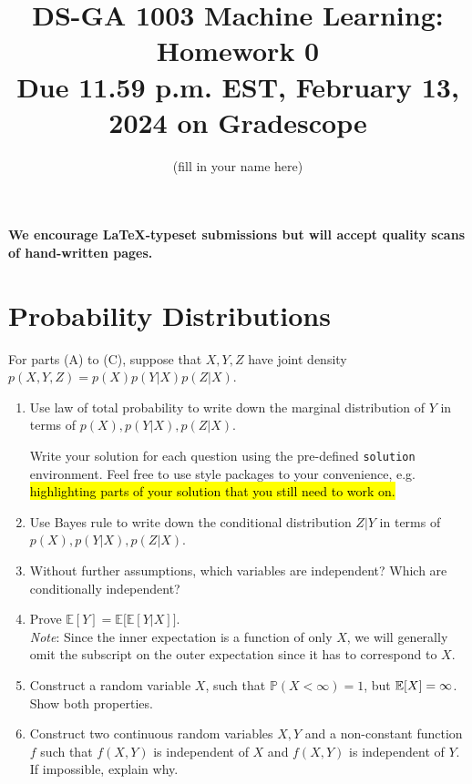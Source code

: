 \documentclass[11pt]{article}
\newenvironment{solution}{\proof[Solution]\color{blue}}{\endproof}
\begin{document}
\title{DS-GA 1003 Machine Learning: Homework 0 \\
\textbf{\large{Due 11.59 p.m. EST, February 13, 2024 on Gradescope}}}
\author{{\color{blue}(fill in your name here)}}
\date{}
\maketitle

\noindent \textbf{We encourage \LaTeX-typeset submissions but will accept quality scans of hand-written pages.}


\section{Probability Distributions}

For parts (A) to (C), suppose that $X,Y,Z$ have joint density $p(X,Y,Z)=p(X)p(Y|X)p(Z|X)$.

\begin{enumerate}[label=(\Alph*)]
    \item Use law of total probability to write down the marginal distribution of $Y$ in terms of $p(X),p(Y|X),p(Z|X)$.
    
    \begin{solution}
        Write your solution for each question using the pre-defined \texttt{solution} environment. Feel free to use style packages to your convenience, e.g. \hl{highlighting parts of your solution that you still need to work on.}
    \end{solution}
    

    \item Use Bayes rule to write down the conditional distribution $Z|Y$ in terms of $p(X),p(Y|X),p(Z|X)$.
    

    \item Without further assumptions, which variables are independent? Which are conditionally independent? 
        
            
    \item Prove $\mathbb{E}[Y]=\mathbb{E}\Big[\mathbb{E}[Y|X]\Big]$. \\
    
    \textit{Note}: Since the inner expectation is a function of only $X$, we will generally omit the subscript on the outer expectation since it has to correspond to $X$.
    
    \item Construct a random variable $X$, such that $\mathbb{P}(X < \infty) = 1$, but $\mathbb{E}[X] = \infty$. Show both properties.
    
    \item Construct two continuous random variables $X, Y$ and a non-constant function $f$ such that $f(X,Y)$ is independent of $X$ and $f(X,Y)$ is independent of $Y$. If impossible, explain why.
    


\end{enumerate} 
\end{document}
